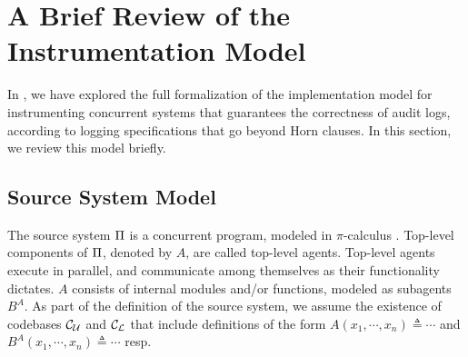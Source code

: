 \section{A Brief Review of the Instrumentation Model} \label{sec:implmodel}

In \cite{amirmoh-tr21}, we have explored the full formalization of the implementation model for instrumenting concurrent systems that guarantees the correctness of audit logs, according to logging specifications that go beyond Horn clauses. In this section, we review this model briefly. 

\subsection{Source System Model} \label{sec:pi}

The source system $\Pi$ is a concurrent program, modeled in $\pi$-calculus \cite{parrow2001introduction}. Top-level components of $\Pi$, denoted by $A$, are called top-level agents. Top-level agents execute in parallel, and communicate among themselves as their functionality dictates. $A$ consists of internal modules and/or functions, modeled as subagents $B^A$. As part of the definition of the source system, we assume the existence of codebases $\mathcal{C}_\mathcal{U}$ and $\mathcal{C}_\mathcal{L}$ that include definitions of the form $A(x_1, \cdots, x_n) \triangleq \cdots$ and $B^A (x_1, \cdots, x_n) \triangleq \cdots$ resp.



